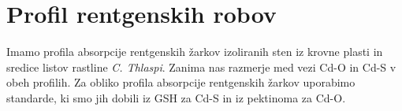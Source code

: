 \documentclass[slovene,11pt,a4paper]{article}
\numberwithin{equation}{section} %
\numberwithin{figure}{section} %
\numberwithin{table}{section} %
\begin{document}
\section{Profil rentgenskih robov}

Imamo profila absorpcije rentgenskih žarkov izoliranih sten iz krovne plasti in sredice listov rastline \textit{C. Thlaspi}. Zanima nas razmerje med vezi Cd-O in Cd-S v obeh profilih. Za obliko profila absorpcije rentgenskih žarkov uporabimo standarde, ki smo jih dobili iz GSH za Cd-S in iz pektinoma za Cd-O. 	


\begin{figure}[ht]
\noindent{}


\end{figure}
\end{document}

